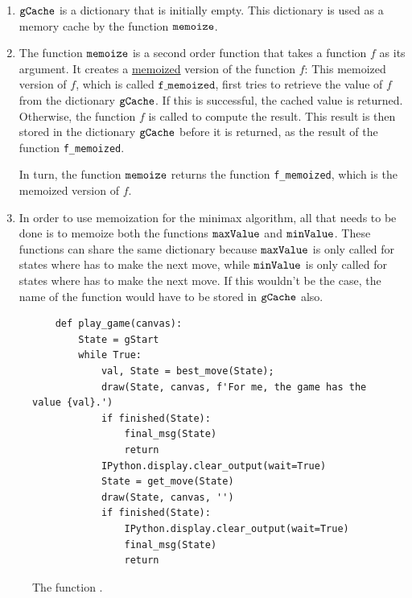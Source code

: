 \begin{enumerate}
\item $\texttt{gCache}$ is a dictionary that is initially empty.  This dictionary is used as a memory cache by 
      the function $\texttt{memoize}$.
\item The function $\texttt{memoize}$ is a second order function that takes a function $f$ as its argument.
      It creates a \href{https://en.wikipedia.org/wiki/Memoization}{memoized} version of the function $f$:
      This memoized version of $f$, which is called $\mathtt{f\_memoized}$, first tries to retrieve the value
      of $f$ from the dictionary $\texttt{gCache}$. 
      If this is successful, the cached value is returned.  Otherwise, the function $f$ is called
      to compute the result.  This result is then stored in the dictionary $\texttt{gCache}$ before it is
      returned, as the result of the function \texttt{f\_memoized}.
      
      In turn, the function $\texttt{memoize}$ returns the function \texttt{f\_memoized}, which is the memoized
      version of $f$. 
\item In order to use memoization for the minimax algorithm, all that needs to be done is to memoize both
      the functions $\texttt{maxValue}$ and $\texttt{minValue}$.  These functions can share the same dictionary
       because  $\texttt{maxValue}$ is only called for states where  has to make the
      next move, while  $\texttt{minValue}$ is only called for states where  has to make the
      next move.  If this wouldn't be the case, the name of the function would have to be stored in
      $\texttt{gCache}$ also.

\end{enumerate}

\begin{figure}[!ht]
\centering
\begin{verbatim}
    def play_game(canvas):
        State = gStart
        while True: 
            val, State = best_move(State);
            draw(State, canvas, f'For me, the game has the value {val}.')
            if finished(State):
                final_msg(State)
                return
            IPython.display.clear_output(wait=True)
            State = get_move(State)
            draw(State, canvas, '')
            if finished(State):
                IPython.display.clear_output(wait=True)
                final_msg(State)
                return
\end{verbatim}
\caption{The function .}
\label{fig:Minimax.ipynb:play_game}
\end{figure}
\FloatBarrier

